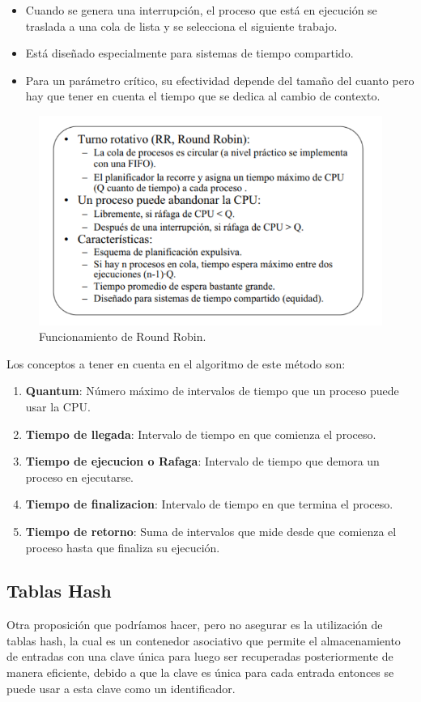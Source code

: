 \documentclass[conference,letterpaper]{IEEEtran}
\begin{document}
\begin{itemize}
    \item Cuando se genera una interrupción, el proceso que está en ejecución se traslada a una cola de lista y se selecciona el siguiente trabajo.
    \item Está diseñado especialmente para sistemas de tiempo compartido.
    \item Para un parámetro crítico, su efectividad depende del tamaño del cuanto pero hay que tener en cuenta el tiempo que se dedica al cambio de contexto.
\end{itemize}

\begin{figure}[thpb]
      \centering
      \includegraphics[width=0.6\linewidth]{rr.png}
      \caption{Funcionamiento de Round Robin.}
      \label{fig:RR}
\end{figure}

Los conceptos a tener en cuenta en el algoritmo de este método son:
\begin{enumerate}
    \item \textbf{Quantum}: Número máximo de intervalos de tiempo que un proceso puede usar la CPU.
    \item \textbf{Tiempo de llegada}: Intervalo de tiempo en que comienza el proceso.
    \item \textbf{Tiempo de ejecucion o Rafaga}: Intervalo de tiempo que demora un proceso en ejecutarse.
    \item \textbf{Tiempo de finalizacion}: Intervalo de tiempo en que termina el proceso.
    \item \textbf{Tiempo de retorno}: Suma de intervalos que mide desde que comienza el proceso hasta que finaliza su ejecución.
\end{enumerate}

\subsection{Tablas Hash}
Otra proposición que podríamos hacer, pero no asegurar es la utilización de tablas hash, la cual es un contenedor asociativo que permite el almacenamiento de entradas con una clave única para luego ser recuperadas posteriormente de manera eficiente, debido a que la clave es única para cada entrada entonces se puede usar a esta clave como un identificador.
\end{document}
